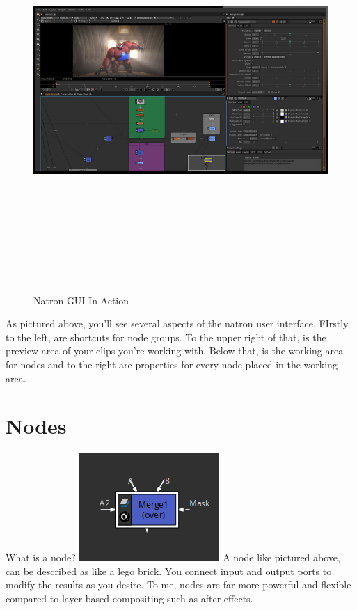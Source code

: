 \documentclass[letterpaper,12pt,oneside]{book}
\begin{document}
\begin{figure}[!t]
\vspace*{-1in}
\includegraphics[width=\linewidth,height=6in]{./imgs/Natron.png}
\caption{Natron GUI In Action}
\end{figure}



\newpage
As pictured above, you'll see several aspects of the natron user interface. FIrstly, to the left, are shortcuts for node groups. To the upper right of that, is the preview area of your clips you're working with. Below that, is the working area for nodes and to the right are properties for every node placed in the working area.

\newpage

\section{Nodes}
\noindent
What is a node?
\bigbreak
\includegraphics{./imgs/mergenode.png}
\bigbreak
A node like pictured above, can be described as like a lego brick.
You connect input and output ports to modify the results as you desire.
To me, nodes are far more powerful and flexible compared to layer based compositing such as after effects.
\end{document}
